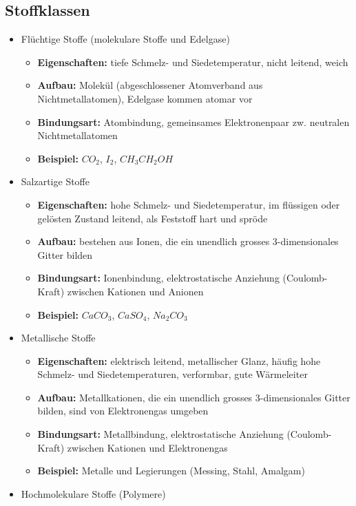 \subsection{Stoffklassen}
\begin{itemize}
	\item Flüchtige Stoffe (molekulare Stoffe und Edelgase)
	\begin{itemize}
	    \item \textbf{Eigenschaften:} tiefe Schmelz- und Siedetemperatur, nicht leitend, weich
	    \item \textbf{Aufbau:} Molekül (abgeschlossener Atomverband aus Nichtmetallatomen), Edelgase kommen atomar vor
	    \item \textbf{Bindungsart:} Atombindung, gemeinsames Elektronenpaar zw. neutralen Nichtmetallatomen
	    \item \textbf{Beispiel:} $CO_2$, $I_2$, $CH_3CH_2OH$
	\end{itemize}
	\item Salzartige Stoffe
	\begin{itemize}
	    \item \textbf{Eigenschaften:} hohe Schmelz- und Siedetemperatur, im flüssigen oder gelösten Zustand leitend, als Feststoff hart und spröde
	    \item \textbf{Aufbau:} bestehen aus Ionen, die ein unendlich grosses 3-dimensionales Gitter bilden
	    \item \textbf{Bindungsart:} Ionenbindung, elektrostatische Anziehung (Coulomb-Kraft) zwischen Kationen und Anionen
	    \item \textbf{Beispiel:} $CaCO_3$, $CaSO_4$, $Na_2CO_3$
	\end{itemize}
	\item Metallische Stoffe
	\begin{itemize}
	    \item \textbf{Eigenschaften:} elektrisch leitend, metallischer Glanz, häufig hohe Schmelz- und Siedetemperaturen, verformbar, gute Wärmeleiter
	    \item \textbf{Aufbau:} Metallkationen, die ein unendlich grosses 3-dimensionales Gitter bilden, sind von Elektronengas umgeben
	    \item \textbf{Bindungsart:} Metallbindung, elektrostatische Anziehung (Coulomb-Kraft) zwischen Kationen und Elektronengas
	    \item \textbf{Beispiel:} Metalle und Legierungen (Messing, Stahl, Amalgam)
	\end{itemize}
	\item Hochmolekulare Stoffe (Polymere)

\end{itemize}
